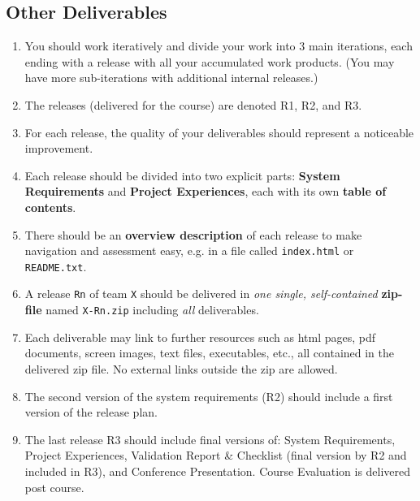 \documentclass{project}
\begin{document}
\subsection{Other Deliverables}
  \begin{enumerate}[nolistsep]
    \item You should work iteratively and divide your work into 3 main iterations, each ending with a release with all your accumulated work products. (You may have more sub-iterations with additional internal releases.)
    \item The releases (delivered for the course) are denoted R1, R2, and R3.
    \item For each release, the quality of your deliverables should represent a noticeable improvement.
    \item Each release should be divided into two explicit parts: {\bf System Requirements} and {\bf Project Experiences}, each with its own {\bf table of contents}.
    \item There should be an {\bf overview description} of each release to make navigation and assessment easy, e.g. in a file called \verb+index.html+ or \verb+README.txt+.
    \item A release \verb+Rn+ of team \verb+X+ should be delivered in {\it one single, self-contained} {\bf zip-file} named \verb+X-Rn.zip+ including {\it all} deliverables.
    \item Each deliverable may link to further resources such as html pages, pdf documents, screen images, text files, executables, etc., all contained in the delivered zip file. No external links outside the zip are allowed.
    \item The second version of the system requirements (R2) should include a first version of the release plan.
    \item The last release R3 should include final versions of: System Requirements, Project Experiences, Validation Report \& Checklist (final version by R2 and included in R3), and Conference Presentation. Course Evaluation is delivered post course.


\end{enumerate}
\end{document}
